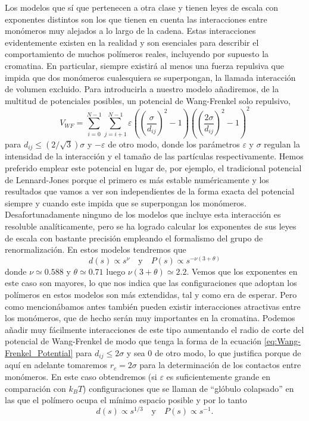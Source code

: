 Los modelos que sí que pertenecen a otra clase y tienen leyes de escala con exponentes distintos son los que tienen en cuenta las interacciones entre monómeros muy alejados a lo largo de la cadena. Estas interacciones evidentemente existen en la realidad y son esenciales para describir el comportamiento de muchos polímeros reales, incluyendo por supuesto la cromatina. En particular, siempre existirá al menos una fuerza repulsiva que impida que dos monómeros cualesquiera se superpongan, la llamada interacción de volumen excluido. Para introducirla a nuestro modelo añadiremos, de la multitud de potenciales posibles, un potencial de Wang-Frenkel \cite{Wang2020} solo repulsivo,
\begin{equation}
    \label{eq:Wang-Frenkel_Potential}
    V_{WF}=\sum_{i=0}^{N-1}\sum_{j=i+1}^{N-1}\varepsilon\left(\left(\frac{\sigma}{d_{ij}}\right)^{2}-1\right)\left(\left(\frac{2\sigma}{d_{ij}}\right)^{2}-1\right)^{2}
\end{equation}
para $d_{ij}\leq\left(2/\sqrt{3}\right)\sigma$ y $-\varepsilon$ de otro modo, donde los parámetros $\varepsilon$ y $\sigma$ regulan la intensidad de la interacción y el tamaño de las partículas respectivamente. Hemos preferido emplear este potencial en lugar de, por ejemplo, el tradicional potencial de Lennard-Jones porque el primero es más estable numéricamente y los resultados que vamos a ver son independientes de la forma exacta del potencial siempre y cuando este impida que se superpongan los monómeros. Desafortunadamente ninguno de los modelos que incluye esta interacción es resoluble analíticamente, pero se ha logrado calcular los exponentes de sus leyes de escala con bastante precisión empleando el formalismo del grupo de renormalización. En estos modelos tendremos que \cite{desCloizeaux1980}
\begin{equation}
    \label{eq:excluded_volume_sd_cp}
    d(s)\propto s^{\nu}  \quad \text{y} \quad P(s)\propto s^{-\nu(3+\theta)}
\end{equation}
donde $\nu\simeq0.588$ y $\theta\simeq0.71$ luego $\nu(3+\theta)\simeq2.2$. Vemos que los exponentes en este caso son mayores, lo que nos indica que las configuraciones que adoptan los polímeros en estos modelos son más extendidas, tal y como era de esperar. Pero como mencionábamos antes también pueden existir interacciones atractivas entre los monómeros, que de hecho serán muy importantes en la cromatina. Podemos añadir muy fácilmente interacciones de este tipo aumentando el radio de corte del potencial de Wang-Frenkel de modo que tenga la forma de la ecuación \ref{eq:Wang-Frenkel_Potential} para $d_{ij}\leq2\sigma$ y sea $0$ de otro modo, lo que justifica porque de aquí en adelante tomaremos $r_c=2\sigma$ para la determinación de los contactos entre monómeros. En este caso obtendremos (si $\varepsilon$ es suficientemente grande en comparación con $k_BT$) configuraciones que se llaman de ``glóbulo colapsado'' en las que el polímero ocupa el mínimo espacio posible y por lo tanto
\begin{equation}
    \label{eq:collapsed_globule_sd_cp}
    d(s)\propto s^{1/3}  \quad \text{y} \quad P(s)\propto s^{-1}.
\end{equation}
